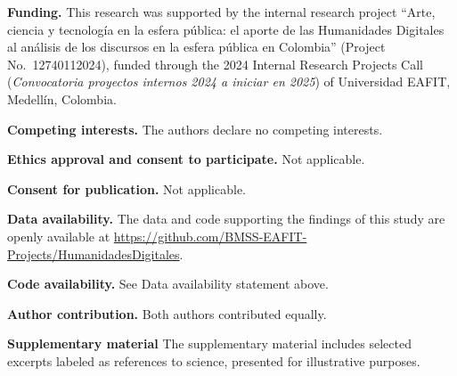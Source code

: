 \documentclass[pdflatex,sn-mathphys-num, iicol]{sn-jnl}
\begin{document}
	\textbf{Funding.} This research was supported by the internal research project ``Arte, ciencia y tecnolog{\'i}a en la esfera p{\'u}blica: el aporte de las Humanidades Digitales al an{\'a}lisis de los discursos en la esfera p{\'u}blica en Colombia'' (Project No.\ 12740112024), funded through the 2024 Internal Research Projects Call (\textit{Convocatoria proyectos internos 2024 a iniciar en 2025}) of Universidad EAFIT, Medell{\'i}n, Colombia.
	
	
	\textbf{Competing interests.} The authors declare no competing interests.
	
	\textbf{Ethics approval and consent to participate.} Not applicable.
	
	\textbf{Consent for publication.} Not applicable.
	
	\textbf{Data availability.} The data and code supporting the findings of this study are openly available at \url{https://github.com/BMSS-EAFIT-Projects/HumanidadesDigitales}.
	
	\textbf{Code availability.} See Data availability statement above.
	
	\textbf{Author contribution.} Both authors contributed equally.
	
	\textbf{Supplementary material} The supplementary material includes selected excerpts labeled as references to science, presented for illustrative purposes.
	
	
	
\end{document}
